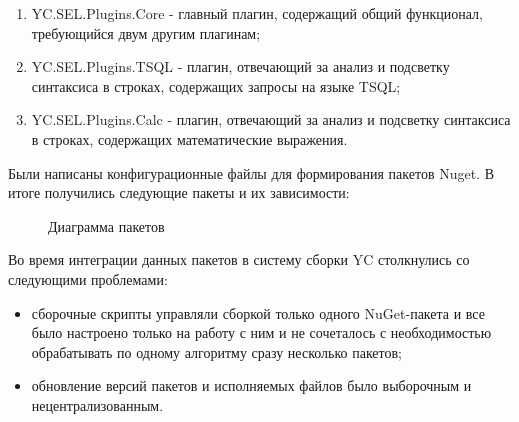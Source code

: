 \documentclass{matmex-diploma}
\begin{document}
\begin{enumerate}
\item
YC.SEL.Plugins.Core - главный плагин, содержащий общий функционал, требующийся двум другим плагинам;
\item
YC.SEL.Plugins.TSQL - плагин, отвечающий за анализ и подсветку синтаксиса в строках, содержащих запросы на языке TSQL;
\item
YC.SEL.Plugins.Calc - плагин, отвечающий за анализ и подсветку синтаксиса в строках, содержащих математические выражения.
\end{enumerate}

Были написаны конфигурационные файлы для формирования пакетов Nuget. В итоге получились следующие пакеты и их зависимости:


\begin{figure}[h!]
	\caption{Диаграмма пакетов}
\end{figure}

Во время интеграции данных пакетов в систему сборки YC столкнулись со следующими проблемами:

\begin{itemize}
\item
сборочные скрипты управляли сборкой только одного NuGet-пакета и все было настроено только на работу с ним и не сочеталось с необходимостью обрабатывать по одному алгоритму сразу несколько пакетов;
\item
обновление версий пакетов и исполняемых файлов было выборочным и нецентрализованным.
\end{itemize}
\end{document}
